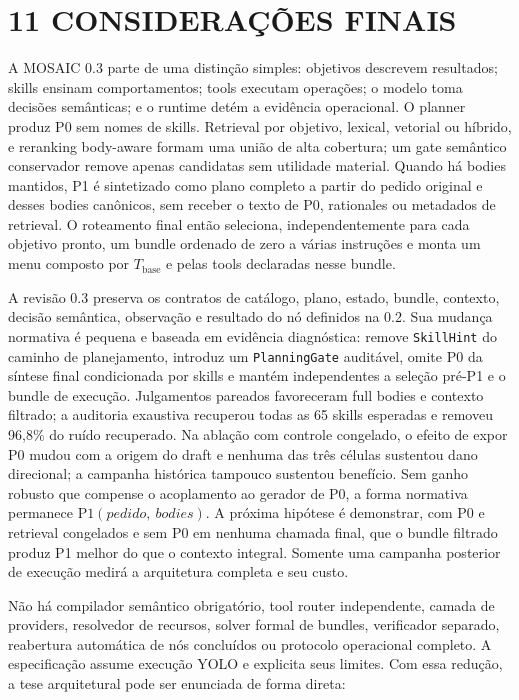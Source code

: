 \documentclass[12pt,a4paper]{article}
\begin{document}
\section*{11 CONSIDERAÇÕES FINAIS}

A MOSAIC 0.3 parte de uma distinção simples: objetivos descrevem resultados; skills ensinam comportamentos; tools executam operações; o modelo toma decisões semânticas; e o runtime detém a evidência operacional. O planner produz P0 sem nomes de skills. Retrieval por objetivo, lexical, vetorial ou híbrido, e reranking body-aware formam uma união de alta cobertura; um gate semântico conservador remove apenas candidatas sem utilidade material. Quando há bodies mantidos, P1 é sintetizado como plano completo a partir do pedido original e desses bodies canônicos, sem receber o texto de P0, rationales ou metadados de retrieval. O roteamento final então seleciona, independentemente para cada objetivo pronto, um bundle ordenado de zero a várias instruções e monta um menu composto por \(T_{\mathrm{base}}\) e pelas tools declaradas nesse bundle.


A revisão 0.3 preserva os contratos de catálogo, plano, estado, bundle, contexto, decisão semântica, observação e resultado do nó definidos na 0.2. Sua mudança normativa é pequena e baseada em evidência diagnóstica: remove \texttt{SkillHint} do caminho de planejamento, introduz um \texttt{PlanningGate} auditável, omite P0 da síntese final condicionada por skills e mantém independentes a seleção pré-P1 e o bundle de execução. Julgamentos pareados favoreceram full bodies e contexto filtrado; a auditoria exaustiva recuperou todas as 65 skills esperadas e removeu 96,8\% do ruído recuperado. Na ablação com controle congelado, o efeito de expor P0 mudou com a origem do draft e nenhuma das três células sustentou dano direcional; a campanha histórica tampouco sustentou benefício. Sem ganho robusto que compense o acoplamento ao gerador de P0, a forma normativa permanece \(\mathrm{P1}(pedido,\ bodies)\). A próxima hipótese é demonstrar, com P0 e retrieval congelados e sem P0 em nenhuma chamada final, que o bundle filtrado produz P1 melhor do que o contexto integral. Somente uma campanha posterior de execução medirá a arquitetura completa e seu custo.

Não há compilador semântico obrigatório, tool router independente, camada de providers, resolvedor de recursos, solver formal de bundles, verificador separado, reabertura automática de nós concluídos ou protocolo operacional completo. A especificação assume execução YOLO e explicita seus limites. Com essa redução, a tese arquitetural pode ser enunciada de forma direta:
\end{document}

